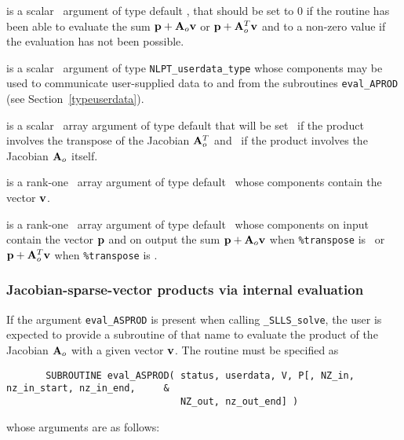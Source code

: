 \documentclass{galahad}
\newcommand{\packagename}{SLLS}
\newcommand{\fullpackagename}{\libraryname\_\packagename}
\newcommand{\solver}{{\tt \fullpackagename\_solve}}
\begin{document}
\begin{description}
 is a scalar \intentout\ argument of type default \integer,
that should be set to 0 if the routine has been able to evaluate the
sum ${\mathbf{p}} + {\mathbf{A}}_o {\mathbf{v}}$ or ${\mathbf{p}} + {\mathbf{A}}_o^T{\mathbf{v}}$
and to a non-zero value if the evaluation has not been possible.

 is a scalar \intentinout\ argument of type
{\tt NLPT\_userdata\_type} whose components may be used
to communicate user-supplied data to and from the subroutines
{\tt eval\_APROD}
(see Section~\ref{typeuserdata}).

 is a scalar \intentin\ array argument of type
default that will be set \true\ if the product involves the transpose
of the Jacobian ${\mathbf{A}}_o^T$ and \false\ if the product involves
the Jacobian ${\mathbf{A}}_o$ itself.

 is a rank-one \intentin\ array argument of type default \realdp\
whose components contain the vector ${\mathbf{v}}$.

 is a rank-one \intentinout\ array argument of type default \realdp\
whose components on input contain the vector ${\mathbf{p}}$ and on output the
sum ${\mathbf{p}} + {\mathbf{A}}_o {\mathbf{v}}$ when {\tt \%transpose} is \false\ or
${\mathbf{p}} + {\mathbf{A}}_o^T {\mathbf{v}}$ when {\tt \%transpose} is \true.

\end{description}



\subsubsection{Jacobian-sparse-vector products via internal evaluation\label{jvps}}

If the argument {\tt eval\_ASPROD} is present when calling \solver, the
user is expected to provide a subroutine of that name to evaluate the
product of the Jacobian ${\mathbf{A}}_o$ with a given vector ${\mathbf{v}}$.
The routine must be specified as

\def\baselinestretch{0.8}
{\tt \begin{verbatim}
       SUBROUTINE eval_ASPROD( status, userdata, V, P[, NZ_in, nz_in_start, nz_in_end,     &
                               NZ_out, nz_out_end] )
\end{verbatim} }
\def\baselinestretch{1.0}
\noindent whose arguments are as follows:
\end{document}
